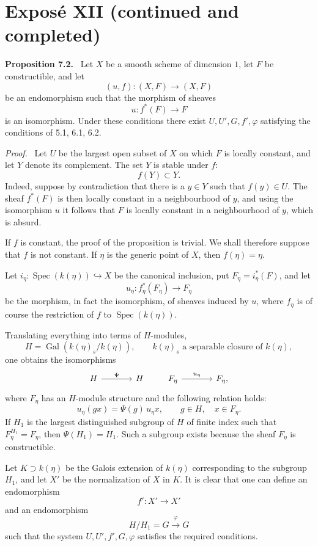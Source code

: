 \documentclass[11pt]{article}
\newenvironment{statement}[1]{\par\medskip\noindent\textbf{#1.}\ }{\par\medskip}
\newenvironment{prooftext}[1][Proof]{\par\noindent\emph{#1.}\ }{\par\medskip}
\DeclareMathOperator{\Spec}{Spec}
\providecommand{\Gal}{\operatorname{Gal}}
\providecommand{\Spec}{\operatorname{Spec}}
\providecommand{\Spec}{\operatorname{Spec}}
\providecommand{\Spec}{\operatorname{Spec}}
\begin{document}
\section*{Exposé XII (continued and completed)}

\begin{statement}{Proposition 7.2}
Let $X$ be a smooth scheme of dimension $1$, let $F$ be constructible, and let
\[
(u,f):(X,F)\longrightarrow (X,F)
\]
be an endomorphism such that the morphism of sheaves
\[
u:f^*(F)\longrightarrow F
\]
is an isomorphism. Under these conditions there exist $U,U',G,f',\varphi$ satisfying the conditions of 5.1, 6.1, 6.2.
\end{statement}

\begin{prooftext}[Proof]
Let $U$ be the largest open subset of $X$ on which $F$ is locally constant, and let $Y$ denote its complement. The set $Y$ is stable under $f$:
\[
f(Y)\subset Y.
\]
Indeed, suppose by contradiction that there is a $y\in Y$ such that $f(y)\in U$. The sheaf $f^*(F)$ is then locally constant in a neighbourhood of $y$, and using the isomorphism $u$ it follows that $F$ is locally constant in a neighbourhood of $y$, which is absurd.

If $f$ is constant, the proof of the proposition is trivial. We shall therefore suppose that $f$ is not constant. If $\eta$ is the generic point of $X$, then $f(\eta)=\eta$.

Let $i_\eta:\Spec(k(\eta))\hookrightarrow X$ be the canonical inclusion, put $F_\eta=i_\eta^*(F)$, and let
\[
u_\eta:f_\eta^*(F_\eta)\longrightarrow F_\eta
\]
be the morphism, in fact the isomorphism, of sheaves induced by $u$, where $f_\eta$ is of course the restriction of $f$ to $\Spec(k(\eta))$.

Translating everything into terms of $H$-modules,
\[
H=\Gal(k(\eta)_s/k(\eta)),\qquad k(\eta)_s\text{ a separable closure of }k(\eta),
\]
one obtains the isomorphisms
\[
\begin{tikzcd}[column sep=large]
H \arrow[r,"\Psi"] & H
\end{tikzcd}
\qquad
\begin{tikzcd}[column sep=large]
F_\eta \arrow[r,"u_\eta"] & F_\eta,
\end{tikzcd}
\]
where $F_\eta$ has an $H$-module structure and the following relation holds:
\[
u_\eta(gx)=\Psi(g)\,u_\eta x,
\qquad g\in H,
\quad x\in F_\eta.
\]
If $H_1$ is the largest distinguished subgroup of $H$ of finite index such that $F_\eta^{H_1}=F_\eta$, then $\Psi(H_1)=H_1$. Such a subgroup exists because the sheaf $F_\eta$ is constructible.

Let $K\supset k(\eta)$ be the Galois extension of $k(\eta)$ corresponding to the subgroup $H_1$, and let $X'$ be the normalization of $X$ in $K$. It is clear that one can define an endomorphism
\[
f':X'\longrightarrow X'
\]
and an endomorphism
\[
H/H_1=G\xrightarrow{\varphi}G
\]
such that the system $U,U',f',G,\varphi$ satisfies the required conditions.
\end{prooftext}
\end{document}
